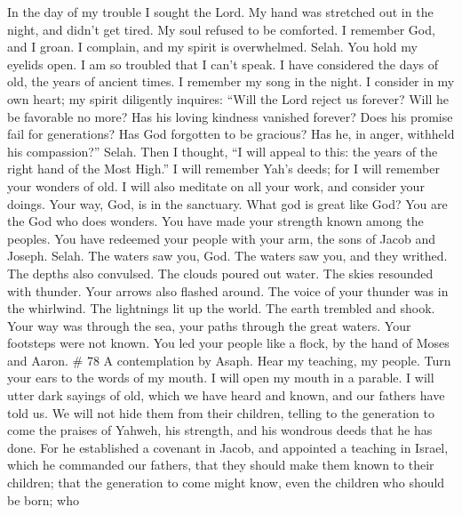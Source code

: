  In the day of my trouble I sought the Lord. My hand was
stretched out in the night, and didn't get tired. My soul refused to be
comforted.  I remember God, and I groan. I complain, and
my spirit is overwhelmed. Selah.  You hold my eyelids
open. I am so troubled that I can't speak.  I have
considered the days of old, the years of ancient times.  I
remember my song in the night. I consider in my own heart; my spirit
diligently inquires:  ``Will the Lord reject us forever?
Will he be favorable no more?  Has his loving kindness
vanished forever? Does his promise fail for generations? 
Has God forgotten to be gracious? Has he, in anger, withheld his
compassion?'' Selah.  Then I thought, ``I will appeal to
this: the years of the right hand of the Most High.''  I
will remember Yah's deeds; for I will remember your wonders of old.
 I will also meditate on all your work, and consider your
doings.  Your way, God, is in the sanctuary. What god is
great like God?  You are the God who does wonders. You
have made your strength known among the peoples.  You
have redeemed your people with your arm, the sons of Jacob and Joseph.
Selah.  The waters saw you, God. The waters saw you, and
they writhed. The depths also convulsed.  The clouds
poured out water. The skies resounded with thunder. Your arrows also
flashed around.  The voice of your thunder was in the
whirlwind. The lightnings lit up the world. The earth trembled and
shook.  Your way was through the sea, your paths through
the great waters. Your footsteps were not known.  You led
your people like a flock, by the hand of Moses and Aaron. \# 78 A
contemplation by Asaph.  Hear my teaching, my people. Turn
your ears to the words of my mouth.  I will open my mouth
in a parable. I will utter dark sayings of old,  which we
have heard and known, and our fathers have told us.  We
will not hide them from their children, telling to the generation to
come the praises of Yahweh, his strength, and his wondrous deeds that he
has done.  For he established a covenant in Jacob, and
appointed a teaching in Israel, which he commanded our fathers, that
they should make them known to their children;  that the
generation to come might know, even the children who should be born; who

